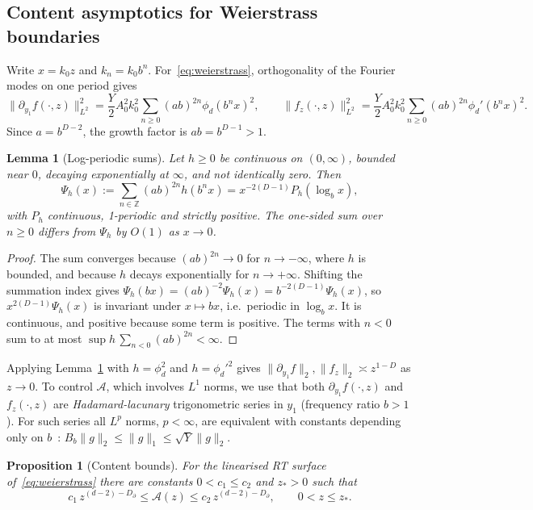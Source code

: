 \documentclass[11pt]{article}
\newtheorem{proposition}{Proposition}[section]
\newtheorem{lemma}{Lemma}
\theoremstyle{definition}\newtheorem{definition}{Definition}[section]
\theoremstyle{remark}\newtheorem*{remark}{Remark}
\newcommand{\cA}{\mathcal{A}}
\newcommand{\ZZ}{\mathbb{Z}}
\begin{document}
\subsection{Content asymptotics for Weierstrass boundaries}
Write $x=k_0z$ and $k_n=k_0b^n$. For~\eqref{eq:weierstrass}, orthogonality of the Fourier modes on one period
gives
\begin{equation}
\|\partial_{y_1}f(\cdot,z)\|_{L^2}^2=\frac{Y}{2}A_0^2k_0^2\sum_{n\ge0}(ab)^{2n}\phi_d(b^nx)^2,\qquad
\|f_z(\cdot,z)\|_{L^2}^2=\frac{Y}{2}A_0^2k_0^2\sum_{n\ge0}(ab)^{2n}\phi_d'(b^nx)^2 .
\label{eq:L2}
\end{equation}
Since $a=b^{D-2}$, the growth factor is $ab=b^{D-1}>1$.
\begin{lemma}[Log-periodic sums]
\label{lem:logper}
Let $h\ge0$ be continuous on $(0,\infty)$, bounded near $0$, decaying exponentially at $\infty$, and not
identically zero. Then
\begin{equation}
\Psi_h(x):=\sum_{n\in\ZZ}(ab)^{2n}h(b^nx)=x^{-2(D-1)}P_h(\log_bx),
\end{equation}
with $P_h$ continuous, 1-periodic and strictly positive. The one-sided sum over $n\ge0$ differs from
$\Psi_h$ by $O(1)$ as $x\to0$.
\end{lemma}
\begin{proof}
The sum converges because $(ab)^{2n}\to0$ for $n\to-\infty$, where $h$ is bounded, and because $h$ decays
exponentially for $n\to+\infty$. Shifting the summation index gives $\Psi_h(bx)=(ab)^{-2}\Psi_h(x)=b^{-2(D-1)}\Psi_h(x)$,
so $x^{2(D-1)}\Psi_h(x)$ is invariant under $x\mapsto bx$, i.e.\ periodic in $\log_bx$. It is continuous,
and positive because some term is positive. The terms with $n<0$ sum to at most $\sup h\,\sum_{n<0}(ab)^{2n}<\infty$.
\end{proof}
Applying Lemma~\ref{lem:logper} with $h=\phi_d^2$ and $h=\phi_d'^2$ gives
$\|\partial_{y_1}f\|_{2},\|f_z\|_{2}\asymp z^{1-D}$ as $z\to0$. To control $\cA$, which involves $L^1$
norms, we use that both $\partial_{y_1}f(\cdot,z)$ and $f_z(\cdot,z)$ are \emph{Hadamard-lacunary}
trigonometric series in $y_1$ (frequency ratio $b>1$). For such series all $L^p$ norms, $p<\infty$, are
equivalent with constants depending only on $b$~\cite{Zygmund}:
$B_b\|g\|_2\le\|g\|_1\le\sqrt{Y}\|g\|_2$.
\begin{proposition}[Content bounds]
\label{prop:content}
For the linearised RT surface of~\eqref{eq:weierstrass} there are constants $0<c_1\le c_2$ and $z_*>0$ such
that
\begin{equation}
c_1\,z^{(d-2)-D_\partial}\le\cA(z)\le c_2\,z^{(d-2)-D_\partial},\qquad 0<z\le z_*.
\label{eq:contentbounds}
\end{equation}
\end{proposition}
\end{document}
